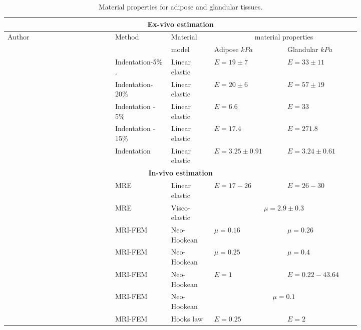 \begin{table}[!h]
\centering
\begin{tabular}{|p{0.25\linewidth}|p{0.13\linewidth}|p{0.1\linewidth}|p{0.17\linewidth}|p{0.17\linewidth}|}
 \hline
\multicolumn{5}{|c|}{\textbf{Ex-vivo estimation}}\\ \hline

\multirow{2}{*}{ Author} & \multirow{2}{*}{ Method} &  Material & \multicolumn{2}{c|}{material properties}\\  \cline{4-5}

&& model &Adipose $kPa$ & Glandular $kPa$ \\  \hline

\cite{krouskop_elastic_1998} & Indentation-5\% . & Linear elastic & $E=19 \pm 7$ &$ E=33 \pm 11$ \\ \hline
 \cite{krouskop_elastic_1998}   & Indentation- 20\%& Linear elastic & $E=20 \pm 6  $& $E = 57 \pm 19 $ \\  \hline
 \cite{wellman_breast_1999}  & Indentation - 5\% & Linear elastic & $E=6.6 $ & $E= 33 $\\ \hline
 \cite{wellman_breast_1999}  & Indentation - 15\% & Linear elastic &$ E= 17.4 $& $E= 271.8 $ \\ \hline
 \cite{samani_method_2004} & Indentation & Linear elastic & $E = 3.25 \pm 0.91 $ & $E = 3.24 \pm 0.61 $ \\ \hline \hline
 \multicolumn{5}{|c|}{\textbf{In-vivo estimation}}\\ \hline
 \cite{van_initial_2003} & MRE & Linear elastic & $E = 17-26 $ & $E = 26-30 $ \\ \hline
 \cite{sinkus_viscoelastic_2005}&MRE& Visco-elastic & \multicolumn{2}{|c|}{$\mu = 2.9 \pm 0.3$} \\ \hline
 \cite{rajagopal_creating_2008}  & MRI-FEM& Neo-Hookean & $\mu = 0.16$ & $\mu = 0.26$ \\ \hline
 \cite{carter_determining_2009} & MRI-FEM& Neo-Hookean &$\mu = 0.25$ & $\mu = 0.4$ \\ \hline
 \cite{han_development_2012} & MRI-FEM & Neo-Hookean & $E= 1$ & $E = 0.22-43.64 $ \\ \hline 
 \cite{gamage_modelling_2012} & MRI-FEM & Neo-Hookean & \multicolumn{2}{|c|}{$\mu = 0.1 $} \\ \hline
 \cite{griesenauer_breast_2017} & MRI-FEM & Hooks law & $E = 0.25$ & $E = 2$\\ \hline
\end{tabular}
\caption{Material properties for adipose and glandular tissues.}
\label{table:materialproperties}
\end{table}

